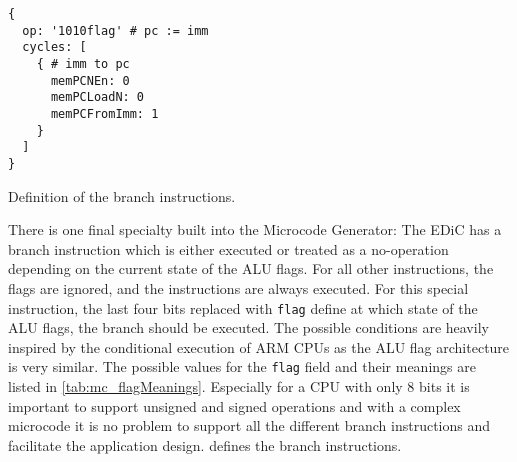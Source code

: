 \begin{listing}[h!]
  \begin{verbatim}
{
  op: '1010flag' # pc := imm
  cycles: [
    { # imm to pc
      memPCNEn: 0
      memPCLoadN: 0
      memPCFromImm: 1
    }
  ]
}
  \end{verbatim}
  \caption{Definition of the branch instructions.}
  \label{lst:mc_branch}
\end{listing}
There is one final specialty built into the Microcode Generator:
The \gls{EDiC} has a branch instruction which is either executed or treated as a no-operation depending on the current state of the \gls{ALU} flags.
For all other instructions, the flags are ignored, and the instructions are always executed.
For this special instruction, the last four bits replaced with \texttt{flag} define at which state of the \gls{ALU} flags, the branch should be executed.
The possible conditions are heavily inspired by the conditional execution of ARM \glspl{CPU}\cite{armCond} as the \gls{ALU} flag architecture is very similar.
The possible values for the \texttt{flag} field and their meanings are listed in \cref{tab:mc_flagMeanings}.
Especially for a \gls{CPU} with only 8 bits it is important to support unsigned and signed operations and with a complex microcode it is no problem to support all the different branch instructions and facilitate the application design.
 defines the branch instructions.
